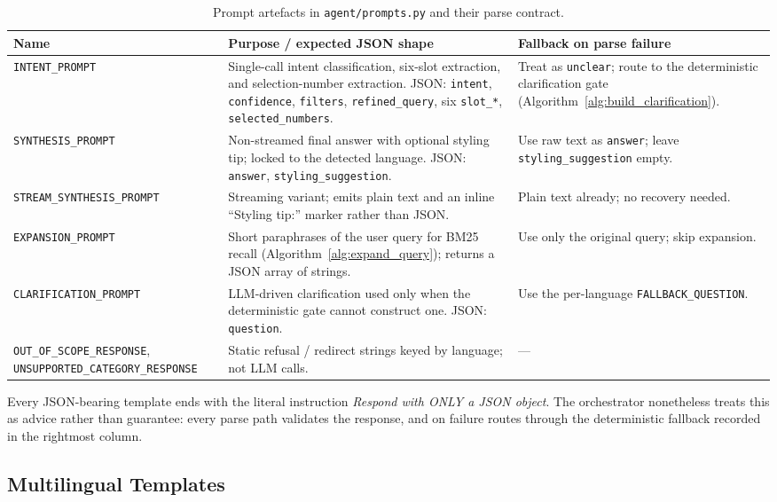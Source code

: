 \begin{table}[H]
\centering
\caption{Prompt artefacts in \texttt{agent/prompts.py} and their parse contract.}
\label{tab:impl_prompt_artefacts}
\scriptsize
\begin{tabular}{p{4.0cm} p{6.0cm} p{4.2cm}}
\toprule
\textbf{Name} & \textbf{Purpose / expected JSON shape} & \textbf{Fallback on parse failure} \\
\midrule
\texttt{INTENT\_PROMPT} & Single-call intent classification, six-slot extraction, and selection-number extraction. JSON: \texttt{intent}, \texttt{confidence}, \texttt{filters}, \texttt{refined\_query}, six \texttt{slot\_*}, \texttt{selected\_numbers}. & Treat as \texttt{unclear}; route to the deterministic clarification gate (Algorithm~\ref{alg:build_clarification}). \\
\texttt{SYNTHESIS\_PROMPT} & Non-streamed final answer with optional styling tip; locked to the detected language. JSON: \texttt{answer}, \texttt{styling\_suggestion}. & Use raw text as \texttt{answer}; leave \texttt{styling\_suggestion} empty. \\
\texttt{STREAM\_SYNTHESIS\_\allowbreak PROMPT} & Streaming variant; emits plain text and an inline ``Styling tip:'' marker rather than JSON. & Plain text already; no recovery needed. \\
\texttt{EXPANSION\_PROMPT} & Short paraphrases of the user query for BM25 recall (Algorithm~\ref{alg:expand_query}); returns a JSON array of strings. & Use only the original query; skip expansion. \\
\texttt{CLARIFICATION\_\allowbreak PROMPT} & LLM-driven clarification used only when the deterministic gate cannot construct one. JSON: \texttt{question}. & Use the per-language \texttt{FALLBACK\_QUESTION}. \\
\texttt{OUT\_OF\_SCOPE\_\allowbreak RESPONSE}, \texttt{UNSUPPORTED\_\allowbreak CATEGORY\_RESPONSE} & Static refusal / redirect strings keyed by language; not LLM calls. & --- \\
\bottomrule
\end{tabular}
\end{table}

Every JSON-bearing template ends with the literal instruction \emph{Respond with ONLY a JSON object}. The orchestrator nonetheless treats this as advice rather than guarantee: every parse path validates the response, and on failure routes through the deterministic fallback recorded in the rightmost column.

\subsection{Multilingual Templates}

